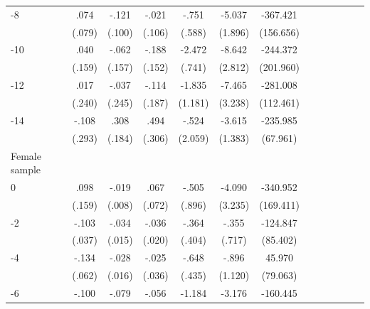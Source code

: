 \begin{table}[p]
\begin{adjustbox}{max width=\linewidth}
\begin{threeparttable}
{\begin{tabular}{l*{6}{S S}}
-8             &     .074         &    -.121         &    -.021         &    -.751         &   -5.037\sym{***}& -367.421\sym{**} \\
                &   (.079)         &   (.100)         &   (.106)         &   (.588)         &  (1.896)         &(156.656)         \\
-10            &     .040         &    -.062         &    -.188         &   -2.472\sym{***}&   -8.642\sym{***}& -244.372         \\
                &   (.159)         &   (.157)         &   (.152)         &   (.741)         &  (2.812)         &(201.960)         \\
-12           &     .017         &    -.037         &    -.114         &   -1.835         &   -7.465\sym{**} & -281.008\sym{**} \\
                &   (.240)         &   (.245)         &   (.187)         &  (1.181)         &  (3.238)         &(112.461)         \\
-14           &    -.108         &     .308\sym{*}  &     .494         &    -.524         &   -3.615\sym{***}& -235.985\sym{***}\\
                &   (.293)         &   (.184)         &   (.306)         &  (2.059)         &  (1.383)         & (67.961)         \\
\midrule
Female sample &&&&&&\\
0               &     .098         &    -.019\sym{**} &     .067         &    -.505         &   -4.090         & -340.952\sym{**} \\
                &   (.159)         &   (.008)         &   (.072)         &   (.896)         &  (3.235)         &(169.411)         \\
-2             &    -.103\sym{***}&    -.034\sym{**} &    -.036\sym{*}  &    -.364         &    -.355         & -124.847         \\
                &   (.037)         &   (.015)         &   (.020)         &   (.404)         &   (.717)         & (85.402)         \\
-4             &    -.134\sym{**} &    -.028\sym{*}  &    -.025         &    -.648         &    -.896         &   45.970         \\
                &   (.062)         &   (.016)         &   (.036)         &   (.435)         &  (1.120)         & (79.063)         \\
-6             &    -.100         &    -.079\sym{*}  &    -.056\sym{*}  &   -1.184\sym{***}&   -3.176\sym{***}& -160.445\sym{*}  \\

\end{tabular}}
\end{threeparttable}
\end{adjustbox}
\end{table}
